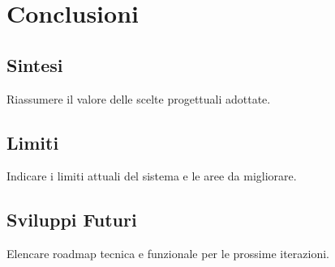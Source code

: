 \chapter{Conclusioni}

\section{Sintesi}
Riassumere il valore delle scelte progettuali adottate.

\section{Limiti}
Indicare i limiti attuali del sistema e le aree da migliorare.

\section{Sviluppi Futuri}
Elencare roadmap tecnica e funzionale per le prossime iterazioni.
